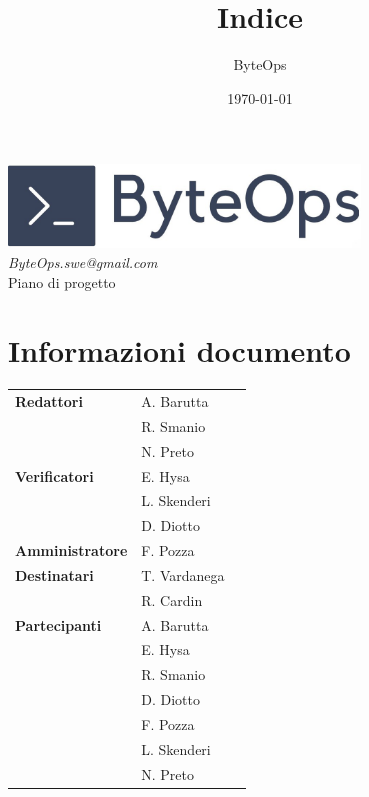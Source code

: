 \documentclass{article}
\title{\textbf{\fontsize{30}{6}\selectfont Indice}}
\author{\fontsize{14}{6}\selectfont ByteOps}
\date{\today}
\begin{document}
\pagestyle{fancy}
\begin{center}
\includegraphics[width = 0.7\textwidth]{../Images/logo.png} \\
\vspace{0.2cm}
\textcolor[RGB]{60, 60, 60}{\textit{ByteOps.swe@gmail.com}} \\
\vspace{1cm}
\fontsize{16}{6}\selectfont Piano di progetto \\
\vspace{0.5cm}
\end{center}

\section*{Informazioni documento}
\def\arraystretch{1.2}
\begin{tabular}{>{\raggedleft\arraybackslash}p{}|>{\raggedright\arraybackslash}p{}c}
\hline
\addlinespace
    \textbf{Redattori} & A. Barutta \\ & R. Smanio \\ & N. Preto \vspace{10pt} \\
    \textbf{Verificatori} & E. Hysa \\ & L. Skenderi \\ & D. Diotto \vspace{10pt} \\
    \textbf{Amministratore} & F. Pozza \vspace{10pt} \\
    \textbf{Destinatari} & T. Vardanega \\ & R. Cardin \vspace{10pt} \\
    \textbf{Partecipanti} & A. Barutta \\ & E. Hysa \\ & R. Smanio \\ & D. Diotto \\ & F. Pozza \\ & L. Skenderi \\ & N. Preto \vspace{10pt} \\
\end{tabular}
\pagebreak 
\end{document}
